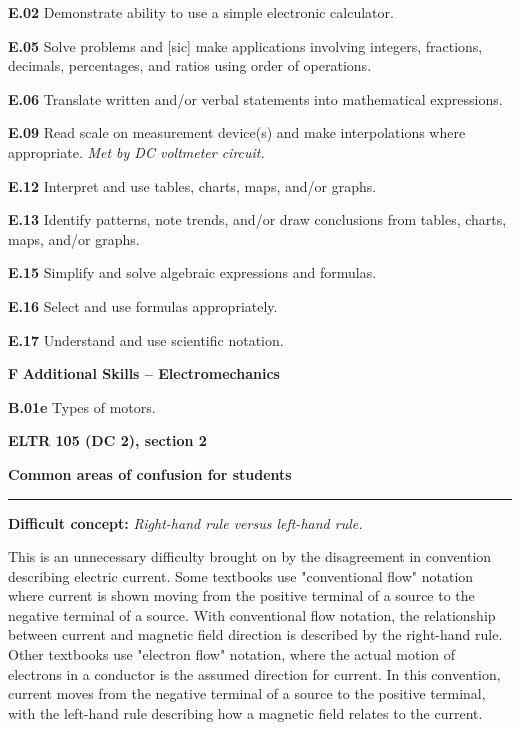 \item{\bf E.02} Demonstrate ability to use a simple electronic calculator.
\item{\bf E.05} Solve problems and [sic] make applications involving integers, fractions, decimals, percentages, and ratios using order of operations.
\item{\bf E.06} Translate written and/or verbal statements into mathematical expressions.
\item{\bf E.09} Read scale on measurement device(s) and make interpolations where appropriate.  {\it Met by DC voltmeter circuit.}
\item{\bf E.12} Interpret and use tables, charts, maps, and/or graphs.
\item{\bf E.13} Identify patterns, note trends, and/or draw conclusions from tables, charts, maps, and/or graphs.
\item{\bf E.15} Simplify and solve algebraic expressions and formulas.
\item{\bf E.16} Select and use formulas appropriately.
\item{\bf E.17} Understand and use scientific notation.
\medskip

\vskip 5pt

\medskip
\item{\bf F} {\bf Additional Skills -- Electromechanics}
\item{\bf B.01e} Types of motors.
\medskip





\vfil \eject

\centerline{\bf ELTR 105 (DC 2), section 2} \bigskip 
 
\vskip 10pt

\noindent
{\bf Common areas of confusion for students}

\vskip 5pt

\hrule \vskip 5pt

\vskip 10pt

\noindent
{\bf Difficult concept: } {\it Right-hand rule versus left-hand rule.}

This is an unnecessary difficulty brought on by the disagreement in convention describing electric current.  Some textbooks use "conventional flow" notation where current is shown moving from the positive terminal of a source to the negative terminal of a source.  With conventional flow notation, the relationship between current and magnetic field direction is described by the right-hand rule.  Other textbooks use "electron flow" notation, where the actual motion of electrons in a conductor is the assumed direction for current.  In this convention, current moves from the negative terminal of a source to the positive terminal, with the left-hand rule describing how a magnetic field relates to the current.

